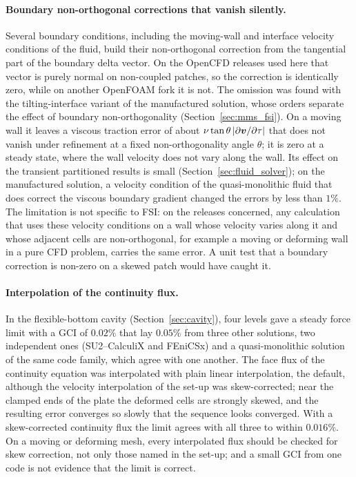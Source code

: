 \paragraph{Boundary non-orthogonal corrections that vanish silently.}
Several boundary conditions, including the moving-wall and interface velocity conditions of the fluid, build their non-orthogonal correction from the tangential part of the boundary delta vector.
On the OpenCFD releases used here that vector is purely normal on non-coupled patches, so the correction is identically zero, while on another OpenFOAM fork it is not.
The omission was found with the tilting-interface variant of the manufactured solution, whose orders separate the effect of boundary non-orthogonality (Section~\ref{sec:mms_fsi}).
On a moving wall it leaves a viscous traction error of about $\nu\tan\theta\,|\partial\boldsymbol{v}/\partial\tau|$ that does not vanish under refinement at a fixed non-orthogonality angle $\theta$; it is zero at a steady state, where the wall velocity does not vary along the wall.
Its effect on the transient partitioned results is small (Section~\ref{sec:fluid_solver}); on the manufactured solution, a velocity condition of the quasi-monolithic fluid that does correct the viscous boundary gradient changed the errors by less than $1\%$.
The limitation is not specific to FSI: on the releases concerned, any calculation that uses these velocity conditions on a wall whose velocity varies along it and whose adjacent cells are non-orthogonal, for example a moving or deforming wall in a pure CFD problem, carries the same error.
A unit test that a boundary correction is non-zero on a skewed patch would have caught it.

\paragraph{Interpolation of the continuity flux.}
In the flexible-bottom cavity (Section~\ref{sec:cavity}), four levels gave a steady force limit with a GCI of $0.02\%$ that lay $0.05\%$ from three other solutions, two independent ones (SU2--CalculiX and FEniCSx) and a quasi-monolithic solution of the same code family, which agree with one another.
The face flux of the continuity equation was interpolated with plain linear interpolation, the default, although the velocity interpolation of the set-up was skew-corrected; near the clamped ends of the plate the deformed cells are strongly skewed, and the resulting error converges so slowly that the sequence looks converged.
With a skew-corrected continuity flux the limit agrees with all three to within $0.016\%$.
On a moving or deforming mesh, every interpolated flux should be checked for skew correction, not only those named in the set-up; and a small GCI from one code is not evidence that the limit is correct.

